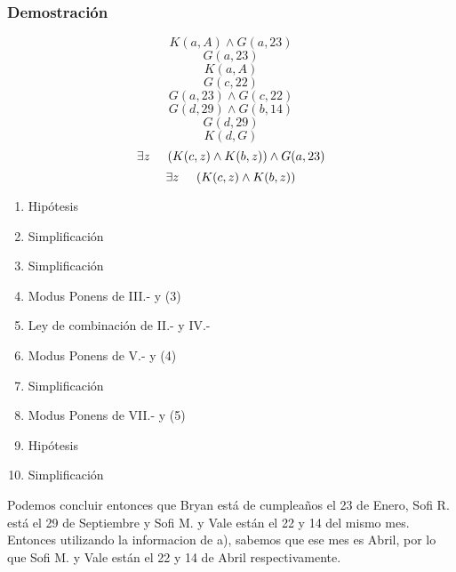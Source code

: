\documentclass[letterpaper,10pt]{article}
\begin{document}
\subsubsection*{Demostraci\'on}
\begin{minipage}[c]{0.4\textwidth}
\begin{equation*}
    K(a,A) \wedge G(a,23)
\end{equation*}
\begin{equation*}
    G(a,23)
\end{equation*}
\begin{equation*}
    K(a,A)
\end{equation*}
\begin{equation*}
    G(c,22)
\end{equation*}
\begin{equation*}
    G(a,23) \wedge G(c,22)
\end{equation*}
\begin{equation*}
    G(d,29) \wedge G(b,14)
\end{equation*}
\begin{equation*}
    G(d,29)
\end{equation*}
\begin{equation*}
    K(d,G)
\end{equation*}
\begin{equation*}
    \exists z \hspace{5mm} (K(c,z) \wedge K(b,z)) \wedge G(a,23)
\end{equation*}
\begin{equation*}
    \exists z \hspace{5mm} (K(c,z) \wedge K(b,z))
\end{equation*}
\end{minipage}
\begin{minipage}[c]{0.5\textwidth}
\begin{enumerate}[I{.-}]
    \item Hip\'otesis
    \item Simplificaci\'on
    \item Simplificaci\'on
    \item Modus Ponens de III.- y (3)
    \item Ley de combinaci\'on de II.- y IV.-
    \item Modus Ponens de V.- y (4)
    \item Simplificaci\'on
    \item Modus Ponens de VII.- y (5)
    \item Hip\'otesis
    \item Simplificaci\'on
\end{enumerate}
\end{minipage}
\vspace{0.5cm}
\newline
Podemos concluir entonces que Bryan est\'a de cumpleaños el 23 de Enero, Sofi R. est\'a el 29 de Septiembre y Sofi M. y Vale est\'an el 22 y 14 del mismo mes. Entonces utilizando la informacion de a), sabemos que ese mes es Abril, por lo que Sofi M. y Vale est\'an el 22 y 14 de Abril respectivamente.
\end{document}
